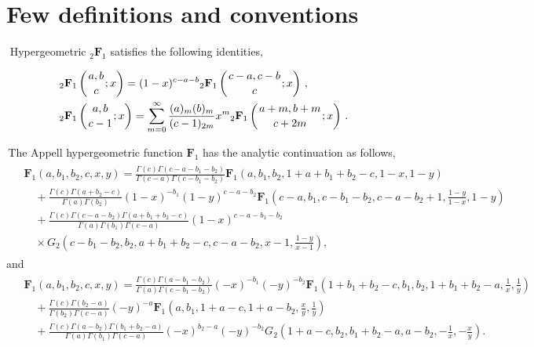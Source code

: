 \appendix
\section{Few definitions and conventions}\label{ch5:app:A}
\textbullet \,\,Hypergeometric ${}_2\mathbf{F}_1$ satisfies the following identities,

\begin{align}
\begin{split}
   &{}_2\mathbf{F}_1\left(\genfrac{}{}{0pt}{}{a,b}{c};x\right) =(1-x)^{c-a-b} {}_2\mathbf{F}_1\left(\genfrac{}{}{0pt}{}{c-a,c-b}{c};x\right)\,,\\&
    {}_2\mathbf{F}_1\left(\genfrac{}{}{0pt}{}{a,b}{c-1};x\right) =\sum_{m=0}^\infty \frac{(a)_m (b)_m}{(c-1)_{2m}}x^m {}_2\mathbf{F}_1\left(\genfrac{}{}{0pt}{}{a+m,b+m}{c+2m};x\right)\,.
\end{split}
\end{align}


\noindent
\textbullet \,The Appell hypergeometric function $\mathbf{F}_1$ has the  analytic continuation as follows,
	\begin{align}
		\label{eq:F1toOne}
		\begin{aligned}
			& \mathbf{F}_1\left(a, b_1, b_2, c, x, y\right)=\frac{\Gamma(c) \Gamma\left(c-a-b_1-b_2\right)}{\Gamma(c-a) \Gamma\left(c-b_1-b_2\right)}\mathbf{F}_1\left(a, b_1, b_2, 1+a+b_1+b_2-c, 1-x, 1-y\right) \\
			& \quad+\frac{\Gamma(c) \Gamma\left(a+b_2-c\right)}{\Gamma(a) \Gamma\left(b_2\right)}(1-x)^{-b_1}(1-y)^{c-a-b_2} \mathbf{F}_1\left(c-a, b_1, c-b_1-b_2, c-a-b_2+1, \frac{1-y}{1-x}, 1-y\right) \\
			& \quad+\frac{\Gamma(c) \Gamma\left(c-a-b_2\right) \Gamma\left(a+b_1+b_2-c\right)}{\Gamma(a) \Gamma\left(b_1\right) \Gamma(c-a)}(1-x)^{c-a-b_1-b_2} \\
			& \quad \times G_2\left(c-b_1-b_2, b_2, a+b_1+b_2-c, c-a-b_2, x-1, \frac{1-y}{x-1}\right),
		\end{aligned}
	\end{align}
	and 
	\begin{align}
		\label{eq:F1toInf}
		\begin{aligned}
			& \mathbf{F}_1\left(a, b_1, b_2, c, x, y\right)=\frac{\Gamma(c) \Gamma\left(a-b_1-b_2\right)}{\Gamma(a) \Gamma\left(c-b_1-b_2\right)}(-x)^{-b_1}(-y)^{-b_2} \mathbf{F}_1\left(1+b_1+b_2-c, b_1, b_2, 1+b_1+b_2-a, \frac{1}{x}, \frac{1}{y}\right)\\
			& \quad+ \frac{\Gamma(c) \Gamma\left(b_2-a\right)}{\Gamma\left(b_2\right) \Gamma(c-a)}(-y)^{-a} \mathbf{F}_1\left(a, b_1, 1+a-c, 1+a-b_2, \frac{x}{y}, \frac{1}{y}\right) \\
			& \quad+\frac{\Gamma(c) \Gamma\left(a-b_2\right) \Gamma\left(b_1+b_2-a\right)}{\Gamma(a) \Gamma\left(b_1\right) \Gamma(c-a)}(-x)^{b_2-a}(-y)^{-b_2} G_2\left(1+a-c, b_2, b_1+b_2-a, a-b_2,-\frac{1}{x}, -\frac{x}{y}\right).
		\end{aligned}
	\end{align}


